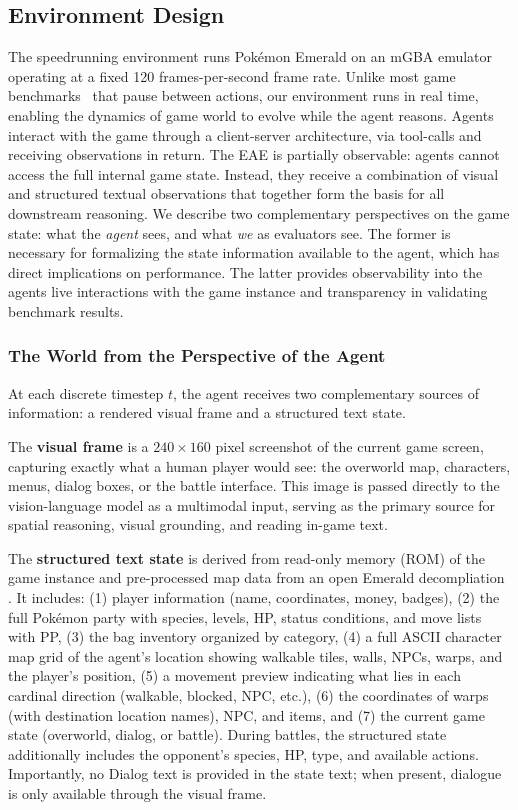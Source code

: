 \subsection{Environment Design}\label{sec:environment_design}

The speedrunning environment runs Pok\'{e}mon Emerald on an mGBA emulator operating at a fixed 120 frames-per-second frame rate. Unlike most game benchmarks~\citep{bellemare2013arcade} that pause between actions, our environment runs in real time, enabling the dynamics of game world to evolve while the agent reasons. Agents interact with the game through a client-server architecture, via tool-calls and receiving observations in return. The EAE is partially observable: agents cannot access the full internal game state. Instead, they receive a combination of visual and structured textual observations that together form the basis for all downstream reasoning. We describe two complementary perspectives on the game state: what the \emph{agent} sees, and what \emph{we} as evaluators see. The former is necessary for formalizing the state information available to the agent, which has direct implications on performance. The latter provides observability into the agents live interactions with the game instance and transparency in validating benchmark results.

\subsubsection{The World from the Perspective of the Agent}\label{sec:agent_perspective}

At each discrete timestep $t$, the agent receives two complementary sources of information: a rendered visual frame and a structured text state.

The \textbf{visual frame} is a $240 \times 160$ pixel screenshot of the current game screen, capturing exactly what a human player would see: the overworld map, characters, menus, dialog boxes, or the battle interface. This image is passed directly to the vision-language model as a multimodal input, serving as the primary source for spatial reasoning, visual grounding, and reading in-game text.

The \textbf{structured text state} is derived from read-only memory (ROM) of the game instance and pre-processed map data from an open \pokemon{} Emerald decompliation \citep{huderlem2025porymap}. It includes: (1) player information (name, coordinates, money, badges), (2) the full Pok\'{e}mon party with species, levels, HP, status conditions, and move lists with PP, (3) the bag inventory organized by category, (4) a full ASCII character map grid of the agent's location showing walkable tiles, walls, NPCs, warps, and the player's position, (5) a movement preview indicating what lies in each cardinal direction (walkable, blocked, NPC, etc.), (6) the coordinates of warps (with destination location names), NPC, and items, and (7) the current game state (overworld, dialog, or battle). During battles, the structured state additionally includes the opponent's species, HP, type, and available actions. Importantly, no Dialog text is provided in the state text; when present, dialogue is only available through the visual frame.


